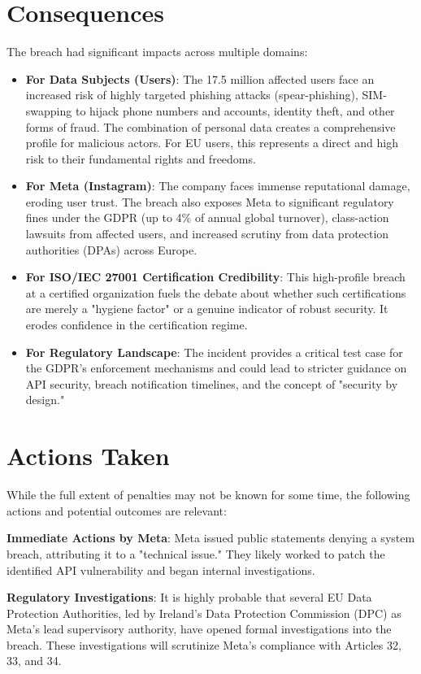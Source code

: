 \documentclass{article}
\begin{document}
\section{Consequences}
The breach had significant impacts across multiple domains:
\begin{itemize}
  \item \textbf{For Data Subjects (Users)}: The 17.5 million affected users face an increased risk of highly targeted phishing attacks (spear-phishing), SIM-swapping to hijack phone numbers and accounts, identity theft, and other forms of fraud. The combination of personal data creates a comprehensive profile for malicious actors. For EU users, this represents a direct and high risk to their fundamental rights and freedoms.

  \item \textbf{For Meta (Instagram)}: The company faces immense reputational damage, eroding user trust. The breach also exposes Meta to significant regulatory fines under the GDPR (up to 4\% of annual global turnover), class-action lawsuits from affected users, and increased scrutiny from data protection authorities (DPAs) across Europe.

  \item \textbf{For ISO/IEC 27001 Certification Credibility}: This high-profile breach at a certified organization fuels the debate about whether such certifications are merely a "hygiene factor" or a genuine indicator of robust security. It erodes confidence in the certification regime.

  \item \textbf{For Regulatory Landscape}: The incident provides a critical test case for the GDPR's enforcement mechanisms and could lead to stricter guidance on API security, breach notification timelines, and the concept of "security by design."
\end{itemize}
\section{Actions Taken}
While the full extent of penalties may not be known for some time, the following actions and potential outcomes are relevant:

\textbf{Immediate Actions by Meta}: Meta issued public statements denying a system breach, attributing it to a "technical issue." They likely worked to patch the identified API vulnerability and began internal investigations.

\textbf{Regulatory Investigations}: It is highly probable that several EU Data Protection Authorities, led by Ireland's Data Protection Commission (DPC) as Meta's lead supervisory authority, have opened formal investigations into the breach. These investigations will scrutinize Meta's compliance with Articles 32, 33, and 34.
\end{document}
